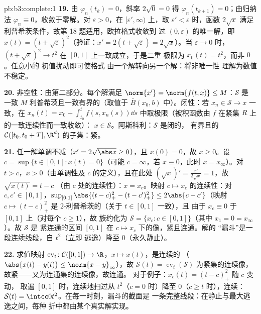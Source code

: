\begin{solution}{pb:b3:complete:1}
\textbf{19.} 由 $\varphi_n(t_k) = 0$，斜率 $2\sqrt0 =
0$ 得 $\varphi_n(t_{k+1}) = 0$；由归纳法 $\varphi_n
\equiv 0$，收敛于零解。对
$\varepsilon > 0$，在 $[\varepsilon', \infty)$ 上，取
$\varepsilon' < \varepsilon$ 时，函数 $2\sqrt x$ 满足
利普希茨条件，故第 18 题适用，欧拉格式收敛到
过 $(0, \varepsilon)$ 的唯一解，即 $x(t) =
(t + \sqrt\varepsilon)^2$（验证：$x' = 2(t + \sqrt
\varepsilon) = 2\sqrt x$）。当 $\varepsilon \to 0$ 时，$(t +
\sqrt\varepsilon)^2 \to t^2$ 在 $[0,1]$ 上一致成立，于是二重
极限为 $x_0(t) = t^2$，而非 $0$。任意小的
初值扰动即可使格式
由一个解转向另一个解：将非唯一性
理解为数值不稳定。

\textbf{20.} 非空性：由第二部分。每个解满足
$\norm{x'} = \norm{f(t, x)} \leq M$：$\mathcal S$ 是
一致 $M$ 利普希茨且一致有界的（取值于
$\bar B(x_0, b)$ 中）。闭性：若 $x_n \in \mathcal S \to x$
一致，在 $x_n(t) = x_0 +
\int_{t_0}^tf(s, x_n(s))\dd s$ 中取极限（被积函数由
$f$ 在紧集 $R$ 上的一致连续性而一致收敛）：
$x \in \mathcal S$。阿斯科利：$\mathcal S$ 是闭的，
有界且的 $\mathcal C([t_0, t_0+T],
\R^d)$ 的子集：紧。

\textbf{21.} 任一解单调不减（$x' = 2\sqrt{\abs
x} \geq 0$），且 $x(0) = 0$，故 $x \geq 0$。设 $c =
\sup\{t \in [0,1] : x(t) = 0\}$（可能 $c = \infty$，若
$x \equiv 0$，此时 $x = x_\infty$）。对 $t > c$，$x
> 0$（由单调性及 $c$ 的定义），且在此处 $(\sqrt
x)' = \frac{x'}{2\sqrt x} = 1$，故 $\sqrt{x(t)} = t - c$
（由 $c$ 处的连续性）：$x = x_c$。映射 $c \mapsto
x_c$ 的连续性：对 $c, c' \in [0, 1]$，$\sup_{[0,1]}\abs{(t - c)_+^2 -
(t - c')_+^2} \leq 2\abs{c - c'}$（映射 $c \mapsto
(t-c)_+^2$ 是 $2$-利普希茨的（关于 $t \in [0,1]$ 一致），且
由于 $x_c \equiv 0$ 于 $[0,1]$ 上（对每个 $c \geq 1$），故
族约化为 $\mathcal S = \{x_c : c \in [0,1]\}$（其中
$x_1 = 0 = x_\infty$）。故 $\mathcal S$ 是
紧连通的区间 $[0,1]$ 在 $c
\mapsto x_c$ 下的像，紧且连通。解的
“漏斗”是一段连续线段，自 $t^2$（立即
逃逸）降至 $0$（永久静止）。

\textbf{22.} 求值映射 $\operatorname{ev}_t\colon
\mathcal C([0,1]) \to \R$，$x \mapsto x(t)$，是连续的
（$\abs{x(t) - y(t)} \leq \norm{x - y}_\infty$），故 $\mathcal
S(t) = \operatorname{ev}_t(\mathcal S)$ 为紧集的连续像，
故紧——又为连通集的连续像，故连通。
对于例子：$x_c(t) = (t - c)_+^2$ 随 $c$ 变动，
取遍 $[0, 1]$ 时，连续地扫过从 $t^2$（$c = 0$ 时）降至
$0$（$c \geq t$ 时），连续：$\mathcal S(t) =
\intcc0{t^2}$。在每一时刻，漏斗的截面是
一条完整线段：在静止与最大逃逸之间，每种
折中都由某个真实解实现。


\end{solution}
